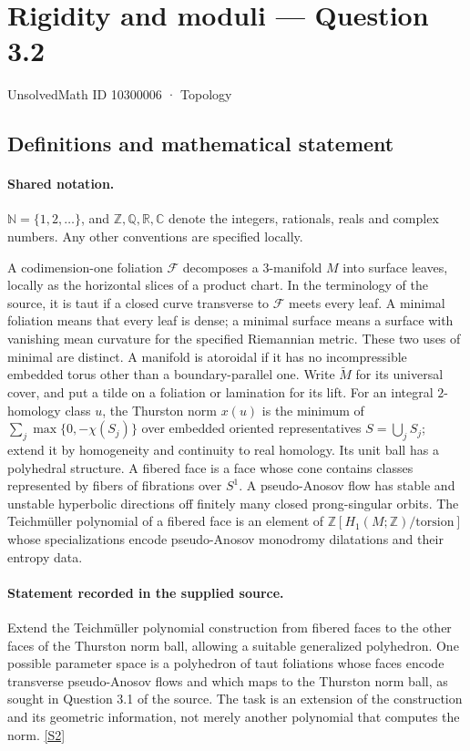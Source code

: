 \documentclass[11pt]{article}
\newcommand{\sref}[2]{\hyperlink{source:#1:#2}{[S#2]}}
\begin{document}
\setcounter{section}{10300005}
\section{Rigidity and moduli — Question 3.2}\label{10300006}
{\small\sffamily UnsolvedMath ID 10300006 · Topology}
\subsection{Definitions and mathematical statement}

\paragraph{Shared notation.}$\mathbb N=\{1,2,\ldots\}$, and $\mathbb Z,\mathbb Q,\mathbb R,\mathbb C$ denote the integers, rationals, reals and complex numbers. Any other conventions are specified locally.


A codimension-one foliation $\mathcal F$ decomposes a $3$-manifold $M$ into surface leaves, locally as the horizontal slices of a product chart. In the terminology of the source, it is taut if a closed curve transverse to $\mathcal F$ meets every leaf. A minimal foliation means that every leaf is dense; a minimal surface means a surface with vanishing mean curvature for the specified Riemannian metric. These two uses of minimal are distinct. A manifold is atoroidal if it has no incompressible embedded torus other than a boundary-parallel one. Write $\widetilde M$ for its universal cover, and put a tilde on a foliation or lamination for its lift. For an integral $2$-homology class $u$, the Thurston norm $x(u)$ is the minimum of $\sum_j\max\{0,-\chi(S_j)\}$ over embedded oriented representatives $S=\bigcup_j S_j$; extend it by homogeneity and continuity to real homology. Its unit ball has a polyhedral structure. A fibered face is a face whose cone contains classes represented by fibers of fibrations over $S^1$. A pseudo-Anosov flow has stable and unstable hyperbolic directions off finitely many closed prong-singular orbits. The Teichm\"uller polynomial of a fibered face is an element of $\mathbb Z[H_1(M;\mathbb Z)/\mathrm{torsion}]$ whose specializations encode pseudo-Anosov monodromy dilatations and their entropy data.
\paragraph{Statement recorded in the supplied source.}
Extend the Teichm\"uller polynomial construction from fibered faces to the other faces of the Thurston norm ball, allowing a suitable generalized polyhedron. One possible parameter space is a polyhedron of taut foliations whose faces encode transverse pseudo-Anosov flows and which maps to the Thurston norm ball, as sought in Question 3.1 of the source. The task is an extension of the construction and its geometric information, not merely another polynomial that computes the norm. \sref{10300006}{2}
\end{document}
